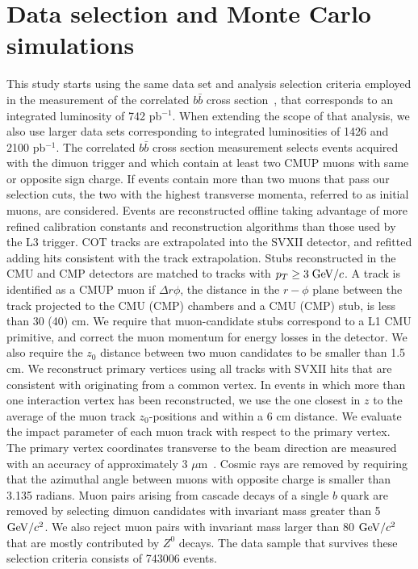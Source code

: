 \documentclass[aps,prd,preprint,floatfix,nofootinbib,superscriptaddress,showpacs,amssymb]{revtex4}
\begin{document}
 \section{Data selection and Monte Carlo simulations} \label{sec:ss-anal}
 This study starts using the same data set and analysis selection criteria
 employed in the measurement of the correlated $b\bar{b}$ cross 
 section~\cite{bbxs}, that corresponds to an integrated luminosity of 
 742  pb$^{-1}$. When extending the scope of that analysis, we also use larger
 data sets corresponding to integrated luminosities of 1426 and 2100 pb$^{-1}$.
 The correlated $b\bar{b}$ cross section measurement selects events acquired 
 with the dimuon trigger and which contain at least two CMUP muons with same
 or opposite sign charge. If events contain more than two muons that pass our
 selection cuts, the two with the highest transverse momenta, referred to as
 initial muons, are considered. Events are reconstructed offline taking 
 advantage of more refined calibration constants and reconstruction
 algorithms than those used by the L3 trigger. COT tracks are extrapolated 
 into the SVXII detector, and refitted adding hits consistent  with the 
 track extrapolation. Stubs reconstructed in the CMU and CMP detectors are
 matched to tracks with  $p_T \geq 3 \; {\rm GeV/}c$. A track is identified as a
 CMUP muon if $\Delta r\phi$, the distance in the $r-\phi$ plane between 
 the track projected to the CMU (CMP) chambers and a CMU (CMP) stub, is 
 less than 30 (40) cm. We require that muon-candidate stubs correspond to 
 a L1 CMU primitive, and correct the muon momentum for energy losses in the
 detector. We also require the $z_0$ distance between two muon candidates to
 be smaller than 1.5 cm. We reconstruct primary vertices using all tracks 
 with SVXII hits that are consistent with originating from a common vertex.
 In events in which more than one interaction vertex has been reconstructed,
 we use the one closest in $z$ to the average of the muon track 
 $z_0$-positions and within a 6 cm distance. We evaluate the impact
 parameter of each muon track with respect to the primary vertex.
 The primary vertex coordinates transverse to the beam direction are
 measured with an accuracy of approximately 3 $\mu$m~\cite{bbxs}.
 Cosmic rays are removed by requiring that the azimuthal angle between muons
 with opposite charge is smaller than 3.135 radians. Muon pairs arising from
 cascade decays of a single $b$ quark are removed by selecting dimuon 
 candidates with invariant mass greater than 5 ${\rm GeV/}c^2$. We also reject
 muon pairs with invariant mass larger than 80 ${\rm GeV/}c^2$ that are mostly
 contributed by $Z^0$ decays. The data sample that survives these 
 selection criteria consists of 743006 events.
\end{document}
